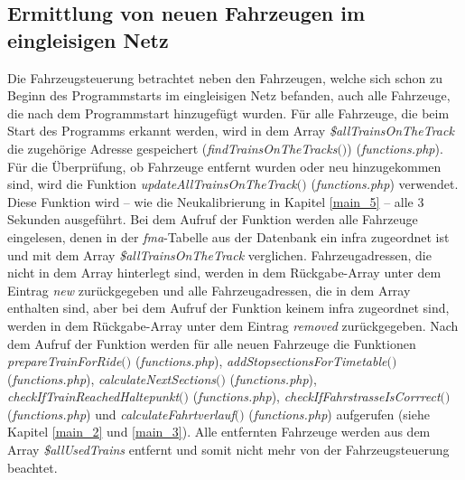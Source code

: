 \subsection{Ermittlung von neuen Fahrzeugen im eingleisigen Netz} \label{main_6}
Die Fahrzeugsteuerung betrachtet neben den Fahrzeugen, welche sich schon zu Beginn des Programmstarts im eingleisigen Netz befanden, auch alle Fahrzeuge, die nach dem Programmstart hinzugefügt wurden. Für alle Fahrzeuge, die beim Start des Programms erkannt werden, wird in dem Array \textit{\$allTrainsOnTheTrack} die zugehörige Adresse gespeichert (\textit{find\-Trains\-On\-The\-Tracks$($$)$}) (\textit{functions.php}). Für die Überprüfung, ob Fahrzeuge entfernt wurden oder neu hinzugekommen sind, wird die Funktion \textit{up\-date\-All\-Trains\-On\-The\-Track$($$)$} (\textit{functions.php}) verwendet. Diese Funktion wird -- wie die Neukalibrierung in Kapitel \ref{main_5} -- alle 3 Sekunden ausgeführt. Bei dem Aufruf der Funktion werden alle Fahrzeuge eingelesen, denen in der \textit{fma}-Tabelle aus der Datenbank ein \ac{infra} zugeordnet ist und mit dem Array \textit{\$allTrainsOnTheTrack} verglichen. Fahrzeugadressen, die nicht in dem Array hinterlegt sind, werden in dem Rückgabe-Array unter dem Eintrag \textit{new} zurückgegeben und alle Fahrzeugadressen, die in dem Array enthalten sind, aber bei dem Aufruf der Funktion keinem \ac{infra} zugeordnet sind, werden in dem Rückgabe-Array unter dem Eintrag \textit{removed} zurückgegeben. Nach dem Aufruf der Funktion werden für alle neuen Fahrzeuge die Funktionen \textit{pre\-pare\-Train\-For\-Ride$($$)$} (\textit{func\-tions.php}), \textit{add\-Stop\-sec\-tions\-For\-Time\-table$($$)$} (\textit{func\-tions.php}), \textit{cal\-culate\-Next\-Sec\-tions$($$)$} (\textit{func\-tions.php}), \textit{check\-If\-Train\-Reached\-Halte\-punkt$($$)$} (\textit{func\-tions.php}), \textit{check\-If\-Fahr\-strasse\-Is\-Corrrect$($$)$} (\textit{func\-tions.php}) und \textit{calculate\-Fahrt\-ver\-lauf$($$)$} (\textit{func\-tions\-.php}) aufgerufen (siehe Kapitel \ref{main_2} und \ref{main_3}). Alle entfernten Fahrzeuge werden aus dem Array \textit{\$allUsedTrains} entfernt und somit nicht mehr von der Fahrzeugsteuerung beachtet. 
